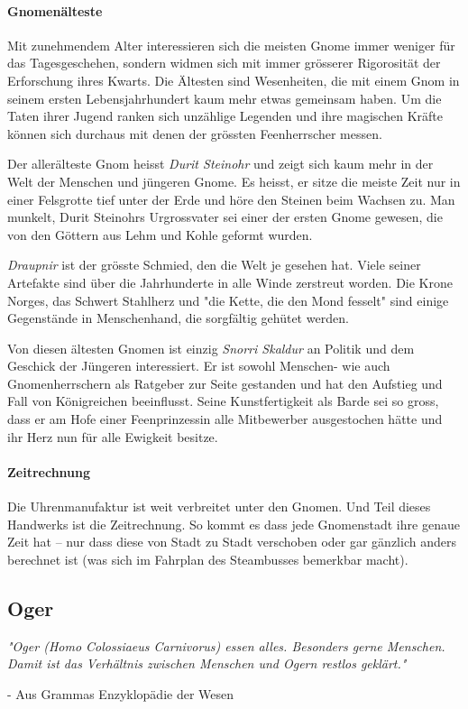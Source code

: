\documentclass[12pt,twoside,twocolumn,openany]{book}
\begin{document}
\paragraph{Gnomenälteste}
Mit zunehmendem Alter interessieren sich die meisten Gnome immer weniger für das Tagesgeschehen, sondern widmen sich mit immer grösserer Rigorosität der Erforschung ihres Kwarts. Die Ältesten sind Wesenheiten, die mit einem Gnom in seinem ersten Lebensjahrhundert kaum mehr etwas gemeinsam haben. Um die Taten ihrer Jugend ranken sich unzählige Legenden und ihre magischen Kräfte können sich durchaus mit denen der grössten Feenherrscher messen.

Der allerälteste Gnom heisst \emph{Durit Steinohr} und zeigt sich kaum mehr in der Welt der Menschen und jüngeren Gnome. Es heisst, er sitze die meiste Zeit nur in einer Felsgrotte tief unter der Erde und höre den Steinen beim Wachsen zu. Man munkelt, Durit Steinohrs Urgrossvater sei einer der ersten Gnome gewesen, die von den Göttern aus Lehm und Kohle geformt wurden.

\emph{Draupnir} ist der grösste Schmied, den die Welt je gesehen hat. Viele seiner Artefakte sind über die Jahrhunderte in alle Winde zerstreut worden. Die Krone Norges, das Schwert Stahlherz und "die Kette, die den Mond fesselt" sind einige Gegenstände in Menschenhand, die sorgfältig gehütet werden.

Von diesen ältesten Gnomen ist einzig \emph{Snorri Skaldur} an Politik und dem Geschick der Jüngeren interessiert. Er ist sowohl Menschen- wie auch Gnomenherrschern als Ratgeber zur Seite gestanden und hat den Aufstieg und Fall von Königreichen beeinflusst. Seine Kunstfertigkeit als Barde sei so gross, dass er am Hofe einer Feenprinzessin alle Mitbewerber ausgestochen hätte und ihr Herz nun für alle Ewigkeit besitze. 

\paragraph{Zeitrechnung}
Die Uhrenmanufaktur ist weit verbreitet unter den Gnomen. Und Teil dieses Handwerks ist die Zeitrechnung. So kommt es dass jede Gnomenstadt ihre genaue Zeit hat – nur dass diese von Stadt zu Stadt verschoben oder gar gänzlich anders berechnet ist (was sich im Fahrplan des Steambusses bemerkbar macht).


\subsection{Oger}
\begin{quotebox}
	\textit{"Oger (Homo Colossiaeus Carnivorus) essen alles. Besonders gerne Menschen. Damit ist das Verhältnis zwischen Menschen und Ogern restlos geklärt."}
	\begin{flushright}
		- Aus Grammas Enzyklopädie der Wesen
	\end{flushright}
\end{quotebox}
\end{document}
